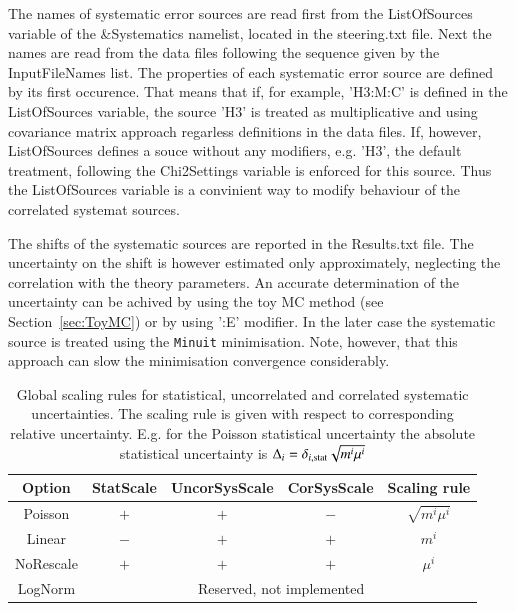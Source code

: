 The names of systematic error sources are read first from the {\sc ListOfSources} variable of the 
{\sc \&Systematics} namelist, located in the {\sc steering.txt} file. Next the names are read from the
data files following the sequence given by the {\sc InputFileNames} list. The properties of each systematic
error source are defined by its first occurence. That means that if, for example, {\sc 'H3:M:C'} is defined
in the {\sc ListOfSources} variable, the source {\sc 'H3'} is treated as multiplicative and using covariance
matrix approach regarless definitions in the data files. If, however, {\sc ListOfSources} defines a souce
without any modifiers, e.g. {\sc 'H3'}, the default treatment, following the {\sc Chi2Settings} variable is
enforced for this source.
Thus the {\sc ListOfSources } variable is a convinient way to modify behaviour of the correlated systemat
sources.

The shifts of the systematic sources are reported in the {\sc Results.txt} file. The uncertainty on the shift
is however estimated only approximately, neglecting the correlation with the theory parameters. An accurate determination
of the uncertainty can be achived by using the toy MC method (see Section~\ref{sec:ToyMC}) or by using {\sc ':E'} 
modifier. In the later case the systematic source is treated using the {\tt Minuit} minimisation. Note, however,
that this approach can slow the minimisation convergence considerably.
\begin{table}
\begin{center}
\begin{tabular}{ccccc} 
\hline
 Option  & {\sc StatScale} & {\sc UncorSysScale} & {\sc CorSysScale} & Scaling rule \\
\hline
  {\sc Poisson}   &  $+$  &  $+$  &  $-$  & $\sqrt{ m^i \mu^i}$ \\
  {\sc Linear}    & $-$   &  $+$  &  $+$  & $m^i$               \\
  {\sc NoRescale} & $+$   &  $+$  &  $+$  & $\mu^i$   \\
  {\sc LogNorm}   &  \multicolumn{4}{c}{Reserved, not implemented} \\
\hline
\end{tabular}
\end{center}
\caption{\label{tab:ErrScale}Global scaling rules for statistical, 
uncorrelated and correlated systematic uncertainties. The scaling
rule is given with respect to corresponding relative uncertainty.
E.g. for the {\sc Poisson} statistical uncertainty the absolute statistical
uncertainty is $\Delta_i = \delta_{i, {\rm stat}}\sqrt{m^i\mu^i}$   }
\end{table}

